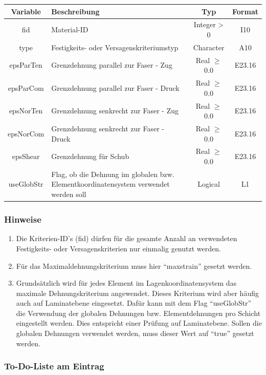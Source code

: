 \documentclass[11pt,titlepage,listof=totoc,bibliography=totoc,twoside]{scrreprt}
\begin{document}
{{\begin{tabularx}{\textwidth}{cXcc}
\toprule
Variable& Beschreibung														& Typ			& Format\\
\midrule
fid		& Material-ID													& Integer > 0		& I10	\\
type		& Festigkeits- oder Versagenskriteriumstyp									& Character		& A10	\\
epsParTen	& Grenzdehnung parallel zur Faser - Zug										& Real $\ge$ 0.0	& E23.16\\
epsParCom	& Grenzdehnung parallel zur Faser - Druck									& Real $\ge$ 0.0	& E23.16\\
epsNorTen	& Grenzdehnung senkrecht zur Faser - Zug									& Real $\ge$ 0.0	& E23.16\\
epsNorCom	& Grenzdehnung senkrecht zur Faser - Druck									& Real $\ge$ 0.0	& E23.16\\
epsShear	& Grenzdehnung für Schub											& Real $\ge$ 0.0	& E23.16\\
useGlobStr	& Flag, ob die Dehnung im globalen bzw. Elementkoordinatensystem verwendet werden soll				& Logical		& L1\\
\bottomrule
\end{tabularx}

\subsubsection{Hinweise}

\begin{enumerate}
\item Die Kriterien-ID's (fid) dürfen für die gesamte Anzahl an verwendeten Festigkeits- oder Versagenskriterien nur einmalig genutzt werden.
\item Für das Maximaldehnungskriterium muss hier ``maxstrain'' gesetzt werden.
\item Grundsätzlich wird für jedes Element im Lagenkoordinatensystem das maximale Dehnungskriterium angewendet. Dieses Kriterium wird aber häufig auch auf Laminatebene eingesetzt. Dafür kann mit dem Flag ``useGlobStr'' die Verwendung der globalen Dehnungen bzw. Elementdehnungen pro Schicht eingestellt werden. Dies entspricht einer Prüfung auf Laminatebene. Sollen die globalen Dehnungen verwendet werden, muss dieser Wert auf ``true'' gesetzt werden.
\end{enumerate}

\subsubsection{To-Do-Liste am Eintrag}

}}
\end{document}
